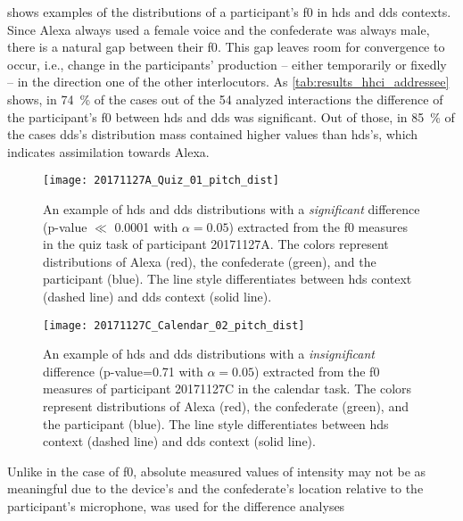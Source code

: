  shows examples of the distributions of a participant's \ac{f0} in \ac{hds} and \ac{dds} contexts.
Since Alexa always used a female voice and the confederate was always male, there is a natural gap between their \ac{f0}.
This gap leaves room for convergence to occur, i.e., change in the participants' production -- either temporarily or fixedly -- in the direction one of the other interlocutors.
As \cref{tab:results_hhci_addressee} shows, in \SI{74}{\percent} of the cases out of the 54 analyzed interactions the difference of the participant's \ac{f0} between \ac{hds} and \ac{dds} was significant.
Out of those, in \SI{85}{\percent} of the cases \ac{dds}'s distribution mass contained higher values than \ac{hds}'s, which indicates assimilation towards Alexa.
%
\begin{figure}[t]
	\centering
	\texttt{[image: 20171127A\_Quiz\_01\_pitch\_dist]}
	\caption[An interaction with significant \acs{hds} and \acs{dds} \acs{f0} distributions difference]
		{An example of \ac{hds} and \ac{dds} distributions with a \emph{significant} difference (p-value $\ll$ 0.0001 with $\alpha=0.05$) extracted from the \ac{f0} measures in the quiz task of participant 20171127A.
		The colors represent distributions of Alexa (red), the confederate (green), and the participant (blue).
		The line style differentiates between \ac{hds} context (dashed line) and \ac{dds} context (solid line).}
	\label{fig:hds_dds_dist_signif}
\end{figure}
%
\begin{figure}
	\texttt{[image: 20171127C\_Calendar\_02\_pitch\_dist]}
	\caption[An interaction with insignificant \acs{hds} and \acs{dds} \acs{f0} distributions difference]
		{An example of \ac{hds} and \ac{dds} distributions with a \emph{insignificant} difference (p-value=0.71 with $\alpha=0.05$) extracted from the \ac{f0} measures of participant 20171127C in the calendar task.
		The colors represent distributions of Alexa (red), the confederate (green), and the participant (blue).
		The line style differentiates between \ac{hds} context (dashed line) and \ac{dds} context (solid line).}
	\label{fig:hds_dds_dist_nonsignif}
\end{figure}
%
Unlike in the case of \ac{f0}, absolute measured values of intensity may not be as meaningful due to the device's and the confederate's location relative to the participant's microphone, was used for the difference analyses
